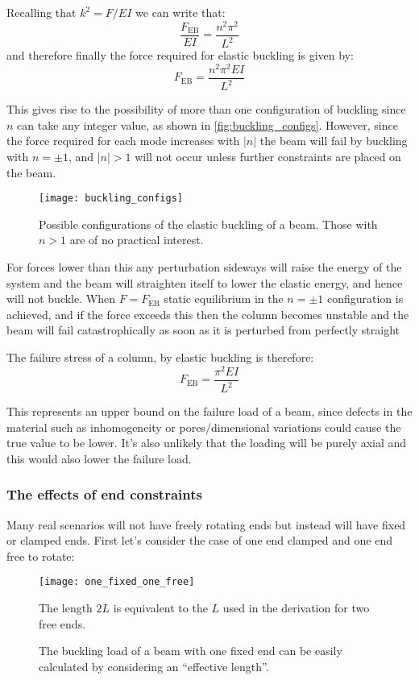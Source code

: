 Recalling that $k^2 = F/EI$ we can write that:
\begin{equation}
\frac{F_{\text{EB}}}{EI} = \frac{n^2\pi^2}{L^2}
\end{equation}
and therefore finally the force required for elastic buckling is given by:
\begin{equation}
F_{\text{EB}} = \frac{n^2 \pi^2 EI}{L^2}
\end{equation}

This gives rise to the possibility of more than one configuration of buckling since $n$ can take any integer value, as shown in \autoref{fig:buckling_configs}. However, since the force required for each mode increases with $|n|$ the beam will fail by buckling with $n=\pm1$, and $|n|>1$ will not occur unless further constraints are placed on the beam.

\begin{figure}
\centering
\texttt{[image: buckling\_configs]}
\caption{Possible configurations of the elastic buckling of a beam. Those with $n > 1$ are of no practical interest.\label{fig:buckling_configs}}
\end{figure}

For forces lower than this any perturbation sideways will raise the energy of the system and the beam will straighten itself to lower the elastic energy, and hence will not buckle. When $F=F_{\text{EB}}$ static equilibrium in the $n=\pm1$ configuration is achieved, and if the force exceeds this then the column becomes unstable and the beam will fail catastrophically as soon as it is perturbed from perfectly straight


The failure stress of a column, by elastic buckling is therefore:
\begin{equation}
F_{\text{EB}} = \frac{\pi^2 EI}{L^2}
\end{equation}

This represents an upper bound on the failure load of a beam, since defects in the material such as inhomogeneity or pores/dimensional variations could cause the true value to be lower. It's also unlikely that the loading will be purely axial and this would also lower the failure load.

\subsubsection{The effects of end constraints}

Many real scenarios will not have freely rotating ends but instead will have fixed or clamped ends. First let's consider the case of one end clamped and one end free to rotate:
\FloatBarrier
\begin{figure}[h!]
\centering
\texttt{[image: one\_fixed\_one\_free]}
\caption{The buckling load of a beam with one fixed end can be easily calculated by considering an ``effective length''.   }

\begin{annotation}
The length $2L$ is equivalent to the $L$ used in the derivation for two free ends. 
\end{annotation}
\end{figure}
\FloatBarrier

